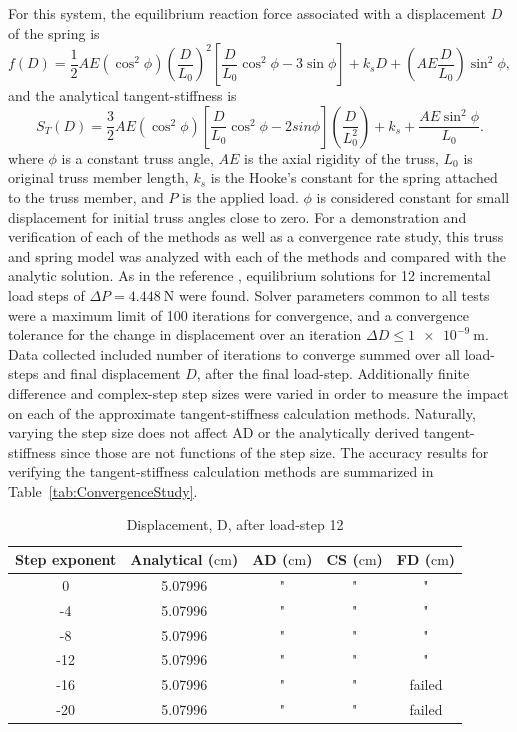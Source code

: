 \documentclass[preprint,12pt]{elsarticle}
\begin{document}
%
For this system, the equilibrium reaction force associated with a displacement $D$ of the spring is 
%
\begin{equation} 
    \label{eqn:TrussForce}
    f(D) = \frac 1 2 AE(\cos^{2}\phi)\left(\frac{D}{L_{0}}\right)^{2}\left[\frac{D}{L_{0}}\cos^{2}\phi - 3\sin\phi\right] + k_{s}D + \left(AE\frac{D}{L_{0}}\right)\sin^{2}\phi,
\end{equation} 
%
and the analytical tangent-stiffness is 
%
\begin{equation} 
    \label{eqn:TrussStiffness}
    S_{T}(D) = \frac 3 2 AE(\cos^{2}\phi)\left[\frac{D}{L_{0}}\cos^{2}\phi - 2sin\phi\right]\left(\frac{D}{L_{0}^{2}}\right) + k_{s} + \frac{AE\sin^{2}\phi}{L_{0}}.
\end{equation}
%
where $\phi$ is a constant truss angle, $AE$ is the axial rigidity of the truss, $L_{0}$ is original truss member length, $k_{s}$ is the Hooke's constant for the spring attached to the truss member, and $P$ is the applied load. $\phi$ is considered constant for small displacement for initial truss angles close to zero. For a demonstration and verification of each of the methods as well as a convergence rate study, this truss and spring model was analyzed with each of the methods and compared with the analytic solution. As in the reference \cite{rezaiee2010dynamic}, equilibrium solutions for 12 incremental load steps of $\Delta P=\SI{4.448}{\newton}$ were found. Solver parameters common to all tests were a maximum limit of 100 iterations for convergence, and a convergence tolerance for the change in displacement over an iteration $\Delta D \le \SI{1e-9}{\meter}$.  Data collected included number of iterations to converge summed over all load-steps and final displacement $D$, after the final load-step. Additionally finite difference and complex-step step sizes were varied in order to measure the impact on each of the approximate tangent-stiffness calculation methods. Naturally, varying the step size does not affect AD or the analytically derived tangent-stiffness since those are not functions of the step size. The accuracy results for verifying the tangent-stiffness calculation methods are summarized in Table~\ref{tab:ConvergenceStudy}. 
%
\begin{table}[tbp]    
  \centering
  \caption{Displacement, D, after load-step 12} \label{tab:Verification}   
        \begin{tabular}{c c c c c}
         \toprule
         Step exponent & Analytical ($\si{\centi\meter}$) & AD ($\si{\centi\meter}$) & CS ($\si{\centi\meter}$) & FD ($\si{\centi\meter}$)\\ 
        \midrule
        0 & 5.07996 & " & " & "\\
        -4 & 5.07996 & " & " & "\\
        -8 & 5.07996 & " & " & "\\
        -12 & 5.07996 & " & " & " \\
        -16 & 5.07996 & " & " & failed \\
        -20 & 5.07996 & " & " & failed \\
        \bottomrule
    \end{tabular}
\end{table}
\end{document}
